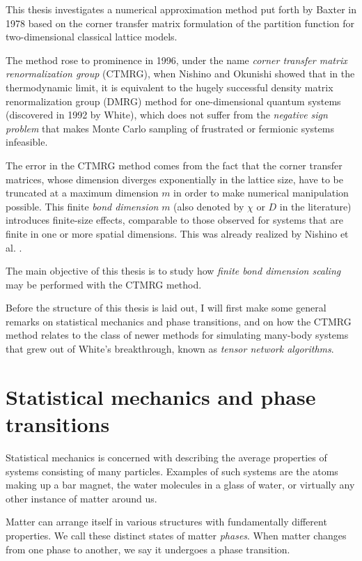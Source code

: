 This thesis investigates a numerical approximation method put forth by
Baxter in 1978 \cite{baxter1978variational, baxter1982exactly_ctm,
tsang1979square} based on the corner transfer matrix formulation of the
partition function for two-dimensional classical lattice models.

The method rose to prominence in 1996, under the name \emph{corner
transfer matrix renormalization group} (CTMRG), when Nishino and Okunishi showed
\cite{nishino1996corner} that in the thermodynamic limit, it is equivalent
to the hugely successful density matrix renormalization group (DMRG)
method for one-dimensional quantum systems \cite{white1992density} (discovered in 1992 by White),
which does not suffer from the \emph{negative sign problem} \cite{troyer2005computational} that makes Monte Carlo
sampling of frustrated or fermionic systems infeasible.

The error in the CTMRG method comes from the fact that the corner transfer
matrices, whose dimension diverges exponentially in the lattice size, have
to be truncated at a maximum dimension $m$ in order to make numerical
manipulation possible. This finite \emph{bond dimension} $m$ (also denoted
by $\chi$ or $D$ in the literature) introduces
finite-size effects, comparable to those observed for systems that are
finite in one or more spatial dimensions. This was already realized by
Nishino et al. \cite{nishino1996numerical}.

The main objective of this thesis is to study how \emph{finite bond
dimension scaling} may be performed with the CTMRG method.

Before the structure of this thesis is laid out, I will first make some
general remarks on statistical mechanics and phase transitions, and on how
the CTMRG method relates to the class of newer methods for simulating
many-body systems that grew out of White's breakthrough, known as
\emph{tensor network algorithms}.

\section{Statistical mechanics and phase transitions}

Statistical mechanics is concerned with describing the average properties
of systems consisting of many particles. Examples of such systems are the
atoms making up a bar magnet, the water molecules in a glass of water, or
virtually any other instance of matter around us.

Matter can arrange itself in various structures with fundamentally
different properties. We call these distinct states of matter
\emph{phases}. When matter changes from one phase to another, we say it
undergoes a phase transition.


